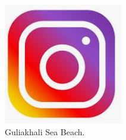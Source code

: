 \documentclass{article}
\begin{document}
\begin{figure}
  \includegraphics[width=\linewidth]{Instragram.jpg}
  \caption{Guliakhali Sea Beach.}
  \label{fig : Guliakhali Sea Beach}
\end{figure}

\end{document}

